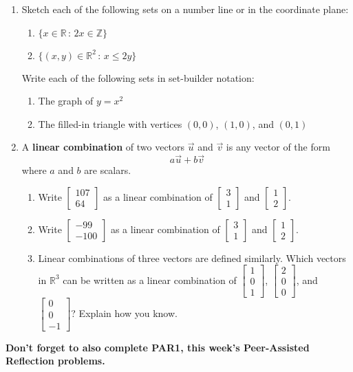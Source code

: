 \documentclass[letter]{article}
\newcommand{\R}{\mathbb{R}}
\newcommand{\Z}{\mathbb{Z}}
\newcommand{\mat}[1]{\begin{bmatrix}#1\end{bmatrix}}
\begin{document}
\begin{enumerate}
		\item Sketch each of the following sets on a number line or in the coordinate plane:
		\begin{enumerate}
			\item $\{x \in \R \,:\, 2x \in \Z\}$
			\item $\{(x,y) \in \R^2 \,:\, x \le 2y \}$
		\end{enumerate}
		Write each of the following sets in set-builder notation:
		\begin{enumerate}[resume]
			\item The graph of $y=x^2$
			\item The filled-in triangle with vertices $(0,0)$, $(1,0)$, and $(0,1)$
		\end{enumerate}
			
		\item A \textbf{linear combination} of two vectors $\vec{u}$ and $\vec{v}$ is any vector of the form 
		\[
			a\vec{u} + b\vec{v}
		\]
		where $a$ and $b$ are scalars.
		\begin{enumerate}
			\item Write $\mat{107\\64}$ as a linear combination of $\mat{3\\1}$ and $\mat{1\\2}$.
			\item Write $\mat{-99\\-100}$ as a linear combination of $\mat{3\\1}$ and $\mat{1\\2}$.
			\item Linear combinations of three vectors are defined similarly.  Which vectors in $\R^3$ can be written as a linear combination of $\mat{1\\0\\1}$, $\mat{2\\0\\0}$, and $\mat{0\\0\\-1}$?  Explain how you know.
		\end{enumerate}

		
	\end{enumerate}
	
	\textbf{Don't forget to also complete PAR1, this week's Peer-Assisted Reflection problems.}
	
\end{document}

